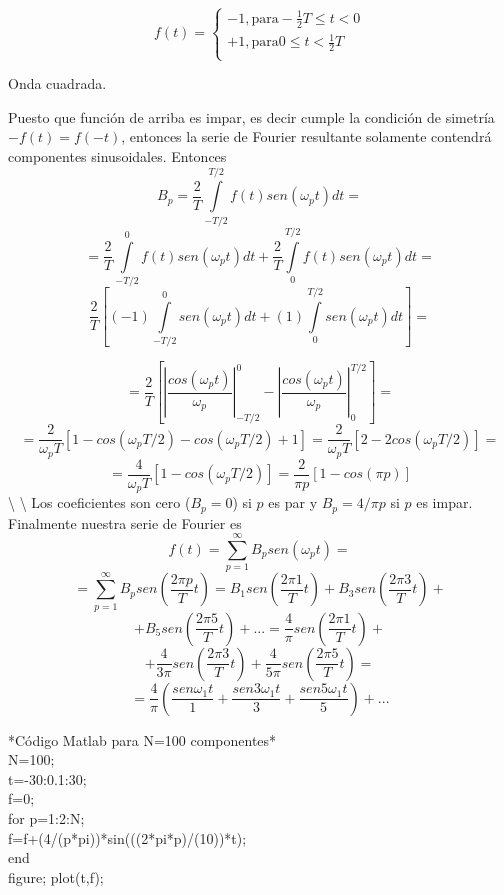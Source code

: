 \documentclass[
]{agujournal2019}
\begin{document}
\[f(t)=
 \left\lbrace
  \begin{array}{l}
     -1,\text{para} -\frac{1}{2}T\le t< 0 \\
     +1,\text{para} 0\le t< \frac{1}{2}T  \\
  \end{array}
  \right.\]

\begin{center}
\end{center}
\begin{center}
Onda cuadrada.
\end{center}

Puesto que función de arriba es impar, es decir cumple la condición de
simetría \(-f(t)=f(-t)\), entonces la serie de Fourier resultante
solamente contendrá componentes sinusoidales. Entonces
\[B_p=\frac{2}{T}\int\limits_{-T/2}^{T/2} f(t) sen(\omega_p t) dt=\]
\[=\frac{2}{T}\int\limits_{-T/2}^{0} f(t) sen(\omega_p t) dt + \frac{2}{T}\int\limits_{0}^{T/2} f(t) sen(\omega_p t) dt=\]
\[\frac{2}{T}\left[ (-1) \int\limits_{-T/2}^{0} sen(\omega_p t) dt +
                   (1) \int\limits_{0}^{T/2} sen(\omega_p t) dt \right]=\]

\[=\frac{2}{T}\left[ \left|\frac{cos(\omega_p t)}{\omega_p}\right|_{-T/2}^{0}
                     -\left|\frac{cos(\omega_p t)}{\omega_p}\right|_{0}^{T/2} \right]=\]
\[=\frac{2}{\omega_p T}\left[ 1 - cos(\omega_p T/2) - cos(\omega_p T/2) + 1  \right]=
\frac{2}{\omega_p T}\left[2 -2cos(\omega_p T/2)\right]=\]
\[=\frac{4}{\omega_p T}\left[1-cos(\omega_p T/2)\right]=
\frac{2}{\pi p}\left[1-cos(\pi p)\right]\] \textbackslash{}
\textbackslash{} Los coeficientes son cero (\(B_p=0\)) si \(p\) es par y
\(B_p=4/\pi p\) si \(p\) es impar. Finalmente nuestra serie de Fourier
es \[f(t)=\sum\limits^\infty_{p=1}B_p sen(\omega_p t)=\]
\[=\sum\limits^\infty_{p=1}B_p sen\left(\frac{2\pi p}{T} t\right)=
B_1 sen\left(\frac{2\pi 1}{T} t\right) + B_3 sen\left(\frac{2\pi 3}{T} t\right) +\]
\[+B_5 sen\left(\frac{2\pi 5}{T} t\right) + ... =\frac{4}{\pi}sen\left(\frac{2\pi 1}{T} t\right) +\]
\[+\frac{4}{3\pi}sen\left(\frac{2\pi 3}{T} t\right) +\frac{4}{5\pi}sen\left(\frac{2\pi 5}{T} t\right)=\]
\[=\frac{4}{\pi}\left( \frac{sen{\omega_1 t}}{1} + \frac{sen{3\omega_1 t}}{3} + \frac{sen{5\omega_1 t}}{5}\right)+...\]

\vspace{0.75cm}
\begin{framed}
\noindent **Código Matlab para N=100 componentes*
\\
{\noindent} N=100;\\
t=-30:0.1:30;\\
f=0;\\
for p=1:2:N;\\
f=f+(4/(p*pi))*sin(((2*pi*p)/(10))*t);\\
end\\
figure; plot(t,f);\\
\end{framed}
\end{document}
